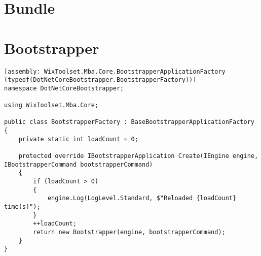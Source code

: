 \documentclass[12pt,a4paper]{report}
\begin{document}
\chapter{Bundle}

\chapter{Bootstrapper}

\begin{lstlisting}
[assembly: WixToolset.Mba.Core.BootstrapperApplicationFactory (typeof(DotNetCoreBootstrapper.BootstrapperFactory))]
namespace DotNetCoreBootstrapper;

using WixToolset.Mba.Core;

public class BootstrapperFactory : BaseBootstrapperApplicationFactory
{
    private static int loadCount = 0;

    protected override IBootstrapperApplication Create(IEngine engine, IBootstrapperCommand bootstrapperCommand)
    {
        if (loadCount > 0)
        {
            engine.Log(LogLevel.Standard, $"Reloaded {loadCount} time(s)");
        }
        ++loadCount;
        return new Bootstrapper(engine, bootstrapperCommand);
    }
}

\end{lstlisting}
\end{document}

